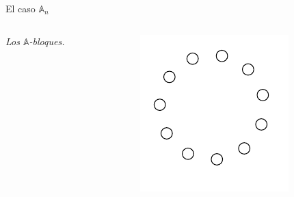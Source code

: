 \documentclass[spanish]{beamer}
\begin{document}
\begin{frame}{El caso $\mathbb{A}_n$}
  \begin{columns}
    \begin{column}{5cm}
      \emph{Los $\mathbb{A}$-bloques.}
    \end{column}
    \begin{column}{5cm}
      \includegraphics[height=1\textwidth]{Figuras/A-bloque1}      
    \end{column}
  \end{columns}
\end{frame}
\end{document}
